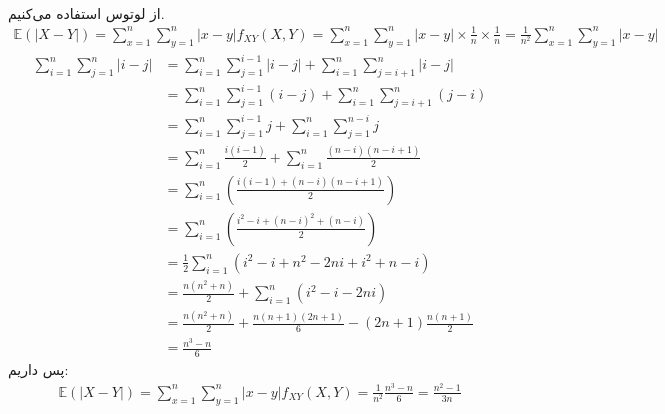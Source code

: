 \\
از لوتوس استفاده می‌کنیم.
\begin{gather*}
    \mathbb{E}(|X - Y|) = \sum_{x=1}^n \sum_{y=1}^n |x - y| f_{XY}(X, Y) =
    \sum_{x=1}^n \sum_{y=1}^n |x - y| \times \frac{1}{n} \times \frac{1}{n} = \frac{1}{n^2} \sum_{x=1}^n \sum_{y=1}^n |x - y|
\end{gather*}
\begin{align*}
    \sum_{i=1}^n\sum_{j=1}^{n}|i-j|
    &=\sum_{i=1}^n\sum_{j=1}^{i-1}|i-j|
    +\sum_{i=1}^n\sum_{j=i+1}^{n}|i-j|\\
    &=\sum_{i=1}^n\sum_{j=1}^{i-1}(i-j)
    +\sum_{i=1}^n\sum_{j=i+1}^{n}(j-i)\\
    &=\sum_{i=1}^n\sum_{j=1}^{i-1}j
    +\sum_{i=1}^n\sum_{j=1}^{n-i}j\\
    &=\sum_{i=1}^n\frac{i(i-1)}{2}
    +\sum_{i=1}^n\frac{(n-i)(n-i+1)}{2}\\
    &=\sum_{i=1}^n\left(\frac{i(i-1)+(n-i)(n-i+1)}{2}\right)\\
    &=\sum_{i=1}^n\left(\frac{i^2-i+(n-i)^2+(n-i)}{2}\right)\\
    &=\frac12\sum_{i=1}^n\left(i^2-i+n^2-2ni+i^2+n-i\right)\\
    &=\frac{n(n^2+n)}{2}+\sum_{i=1}^n\left(i^2-i-2ni\right)\\
    &=\frac{n(n^2+n)}{2}+\frac{n(n+1)(2n+1)}{6}-(2n+1)\frac{n(n+1)}{2}\\
    &=\frac{n^3-n}{6}
\end{align*}
پس داریم:
\begin{gather*}
    \mathbb{E}(|X - Y|) = \sum_{x=1}^n \sum_{y=1}^n |x - y| f_{XY}(X, Y) = \frac{1}{n^2} \frac{n^3-n}{6} = \frac{n^2-1}{3n}
\end{gather*}